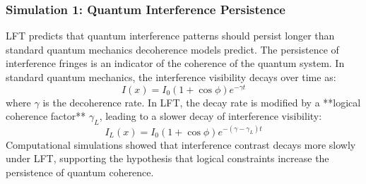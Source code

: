 \subsubsection{Simulation 1: Quantum Interference Persistence}
LFT predicts that quantum interference patterns should persist longer than standard quantum mechanics decoherence models predict. The persistence of interference fringes is an indicator of the coherence of the quantum system. In standard quantum mechanics, the interference visibility decays over time as:
\[
I(x) = I_0 (1 + \cos \phi) e^{-\gamma t}
\]
where \( \gamma \) is the decoherence rate. In LFT, the decay rate is modified by a **logical coherence factor** \( \gamma_L \), leading to a slower decay of interference visibility:
\[
I_L(x) = I_0 (1 + \cos \phi) e^{-(\gamma - \gamma_L) t}
\]
Computational simulations showed that interference contrast decays more slowly under LFT, supporting the hypothesis that logical constraints increase the persistence of quantum coherence.

